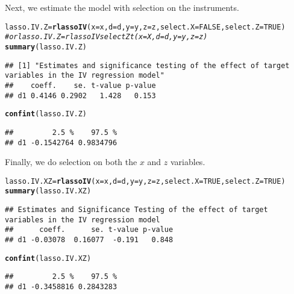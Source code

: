 \documentclass{amsart}\usepackage[]{graphicx}\usepackage[]{color}
\makeatletter
\newcommand{\hlnum}[1]{\textcolor[rgb]{0.686,0.059,0.569}{#1}}%
\newcommand{\hlcom}[1]{\textcolor[rgb]{0.678,0.584,0.686}{\textit{#1}}}%
\newcommand{\hlstd}[1]{\textcolor[rgb]{0.345,0.345,0.345}{#1}}%
\newcommand{\hlkwb}[1]{\textcolor[rgb]{0.69,0.353,0.396}{#1}}%
\newcommand{\hlkwc}[1]{\textcolor[rgb]{0.333,0.667,0.333}{#1}}%
\newcommand{\hlkwd}[1]{\textcolor[rgb]{0.737,0.353,0.396}{\textbf{#1}}}%
\newenvironment{kframe}{%
 \def\at@end@of@kframe{}%
 \ifinner\ifhmode%
  \def\at@end@of@kframe{\end{minipage}}%
  \begin{minipage}{\columnwidth}%
 \fi\fi%
 \def\FrameCommand##1{\hskip\@totalleftmargin \hskip-\fboxsep
 \colorbox{shadecolor}{##1}\hskip-\fboxsep
     \hskip-\linewidth \hskip-\@totalleftmargin \hskip\columnwidth}%
 \MakeFramed {\advance\hsize-\width
   \@totalleftmargin\z@ \linewidth\hsize
   \@setminipage}}%
 {\par\unskip\endMakeFramed%
 \at@end@of@kframe}
\newenvironment{knitrout}{}{} %
\makeatother
\begin{document}
Next, we estimate the model with selection on the instruments. 
\begin{knitrout}
\color{fgcolor}\begin{kframe}
\begin{alltt}
\hlstd{lasso.IV.Z} \hlkwb{=} \hlkwd{rlassoIV}\hlstd{(}\hlkwc{x} \hlstd{= x,} \hlkwc{d} \hlstd{= d,} \hlkwc{y} \hlstd{= y,} \hlkwc{z} \hlstd{= z,} \hlkwc{select.X} \hlstd{=} \hlnum{FALSE}\hlstd{,} \hlkwc{select.Z} \hlstd{=} \hlnum{TRUE}\hlstd{)}
\hlcom{# or lasso.IV.Z = rlassoIVselectZt(x=X, d=d, y=y, z=z)}
\hlkwd{summary}\hlstd{(lasso.IV.Z)}
\end{alltt}
\begin{verbatim}
## [1] "Estimates and significance testing of the effect of target variables in the IV regression model"
##    coeff.    se. t-value p-value
## d1 0.4146 0.2902   1.428   0.153
\end{verbatim}
\begin{alltt}
\hlkwd{confint}\hlstd{(lasso.IV.Z)}
\end{alltt}
\begin{verbatim}
##         2.5 %    97.5 %
## d1 -0.1542764 0.9834796
\end{verbatim}
\end{kframe}
\end{knitrout}


Finally, we do selection on both the $x$ and $z$ variables.
\begin{knitrout}
\color{fgcolor}\begin{kframe}
\begin{alltt}
\hlstd{lasso.IV.XZ} \hlkwb{=} \hlkwd{rlassoIV}\hlstd{(}\hlkwc{x} \hlstd{= x,} \hlkwc{d} \hlstd{= d,} \hlkwc{y} \hlstd{= y,} \hlkwc{z} \hlstd{= z,} \hlkwc{select.X} \hlstd{=} \hlnum{TRUE}\hlstd{,} \hlkwc{select.Z} \hlstd{=} \hlnum{TRUE}\hlstd{)}
\hlkwd{summary}\hlstd{(lasso.IV.XZ)}
\end{alltt}
\begin{verbatim}
## Estimates and Significance Testing of the effect of target variables in the IV regression model 
##      coeff.      se. t-value p-value
## d1 -0.03078  0.16077  -0.191   0.848
\end{verbatim}
\begin{alltt}
\hlkwd{confint}\hlstd{(lasso.IV.XZ)}
\end{alltt}
\begin{verbatim}
##         2.5 %    97.5 %
## d1 -0.3458816 0.2843283
\end{verbatim}
\end{kframe}
\end{knitrout}
\end{document}
